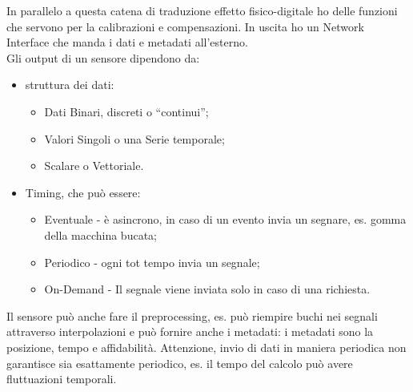 \documentclass[11pt, twocolumn]{article}
\newenvironment{myitemize}
{ \begin{itemize}[topsep=0ex]
		\setlength{\itemsep}{0pt}
		\setlength{\parskip}{0pt}
		\setlength{\parsep}{0pt}     }
	{ \end{itemize}                  }
\begin{document}
In parallelo a questa catena di traduzione effetto fisico-digitale ho delle funzioni che servono per la calibrazioni e compensazioni.
In uscita ho un Network Interface che manda i dati e metadati all'esterno.\\
Gli output di un sensore dipendono da:
\begin{myitemize}
  \item struttura dei dati:
  \begin{myitemize}
    \item Dati Binari, discreti o ``continui'';
    \item Valori Singoli o una Serie temporale;
    \item Scalare o Vettoriale.      
   \end{myitemize}
  \item Timing, che può essere:
  \begin{myitemize}
    \item Eventuale - è asincrono, in caso di un evento invia un segnare, es. gomma della macchina bucata;
    \item Periodico - ogni tot tempo invia un segnale;
    \item On-Demand - Il segnale viene inviata solo in caso di una richiesta.
  \end{myitemize}
\end{myitemize}
Il sensore può anche fare il preprocessing, es. può riempire buchi nei segnali attraverso interpolazioni e può fornire anche i metadati: i metadati sono la posizione, tempo e affidabilità.
Attenzione, invio di dati in maniera periodica non garantisce sia esattamente periodico, es. il tempo del calcolo può avere fluttuazioni temporali.\\
\vspace{-0.5cm}
\end{document}
